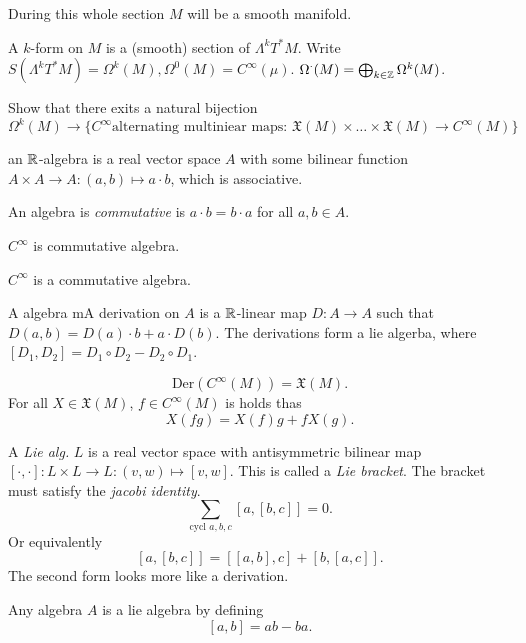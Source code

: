 During this whole section $M$ will be a smooth manifold. 

\begin{definition}
	A $k$-form on $M$ is a (smooth) section of $\Lambda^{k}T^*M$.
	Write $S(\Lambda^{k}T^*M) = \Omega^{k}(M), \Omega^{0}(M) = C^{\infty}(\mu)$.
	$\Omega^{\cdot}(M) = \bigoplus_{k \in \mathbb{Z}} \Omega^{k}(M)$.
\end{definition}
\begin{exercise}
	Show that there exits a natural bijection \[\Omega^{k}(M)\to \{C^{\infty} \text{alternating multiniear maps: $\mathfrak{X}(M)\times \ldots \times \mathfrak{X}(M) \to C^\infty(M)  $}\} \]
\end{exercise}

\begin{definition}
	an $\mathbb{R}$-algebra is a real vector space $A$ with some bilinear function $A \times A \to A: (a, b) \mapsto  a\cdot b$, which is associative.

	An algebra is \emph{commutative} is $a\cdot b = b\cdot a$ for all $a, b \in A$.
\end{definition}
\begin{example}
	$C^{\infty}$ is commutative algebra.
\end{example}
\begin{exercise}
	$C^{\infty}$ is a commutative algebra.
\end{exercise}
\begin{definition}
	A algebra mA derivation on $A$ is a $\mathbb{R}$-linear map $D: A \to A $ such that $D(a, b) = D(a) \cdot b + a \cdot  D(b)$. 
	The derivations form a lie algerba, where $[D_1, D_2] = D_1 \circ D_2 - D_2 \circ D_1$.
\end{definition}
\begin{exercise}
	\[
		\text{Der}(C^{\infty}(M)) = \mathfrak{X} (M)
	.\] 
	For all $X \in \mathfrak{X} \left( M \right) $, $f \in C^{\infty}(M)$ is holds thas \[
		X(fg) = X(f)g + fX(g)
	.\] 
\end{exercise}
\begin{definition}
	A \emph{Lie alg.} $L$ is a real vector space with antisymmetric bilinear map $[\cdot , \cdot ]: L\times L \to L: (v,w) \mapsto [v, w]$. 
	This is called a \emph{Lie bracket}.
	The bracket must satisfy the \emph{jacobi identity}.
	\[
		\sum_{\text{cycl } a, b, c} [a, [b, c]] = 0
	.\] 
	Or equivalently \[
		[a, [b, c]] = [[a,b],c] + [b, [a, c]]
	.\] 
	The second form looks more like a derivation.
\end{definition}
\begin{example}
Any algebra $A$ is a lie algebra by defining \[
	[a, b] = ab - ba
.\] 	
\end{example}
